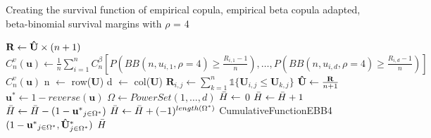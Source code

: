 \documentclass[12pt]{report}
\newcommand{\1}{\mathbf{1}}
\begin{document}
\begin{flushleft}
\begin{algorithm}[H]
\caption{Creating the survival function of empirical copula, empirical beta copula adapted, beta-binomial survival margins with $\rho$ = 4}
\begin{algorithmic}
 
    \State $\textbf{R} \gets \mathbf{\Hat{U}} \times (n + 1)$
    \State $C^{v}_{n}(\textbf{u}) \gets \frac{1}{n}\sum\limits_{i = 1}^{n} C_{n}^{\beta} \left[P\left(BB(n, u_{i,1}, \rho = 4) \ge \frac{R_{i,1} - 1}{n}\right), \dots, P\left(BB(n, u_{i,d}, \rho = 4) \ge \frac{R_{i,d} - 1}{n}\right)\right]$
    \State \Return $C^{v}_{n}(\textbf{u})$
\EndProcedure
{}
    \State n $\gets$ row($\mathbf{U}$)
    \State d $\gets$ col($\mathbf{U}$)
            \State $\textbf{R}_{i,j} \gets \sum\limits_{k = 1}^{n} \mathds{1} \{ \textbf{U}_{i,j} \le \textbf{U}_{k,j} \}$
        \EndFor
    \EndFor
    \State $\mathbf{\Hat{U}} \gets \frac{\mathbf{R}}{n + 1}$ 
    \State $\mathbf{u^{*}} \gets 1 - reverse(\textbf{u})$ 
    \State $\Omega \gets PowerSet(1, \dots, d)$ 
    \State $\Bar{H} \gets$ 0 
            \State $\Bar{H} \gets \Bar{H} + 1$
            \State $\Bar{H} \gets \Bar{H} - (1 - \mathbf{u^{*}}_{j \in \Omega^{*}})$ 
        \Else
            \State $\Bar{H} \gets \Bar{H} + (-1)^{length(\Omega^{*})}$ CumulativeFunctionEBB4$(1 - \mathbf{u^{*}}_{j \in \Omega^{*}}, \mathbf{\Hat{U}^{*}}_{j \in \Omega^{*}}) $
        \EndIf
    \EndFor
    \State \Return $\Bar{H}$
\EndProcedure
\end{algorithmic}
\end{algorithm}


\end{flushleft}
\end{document}
